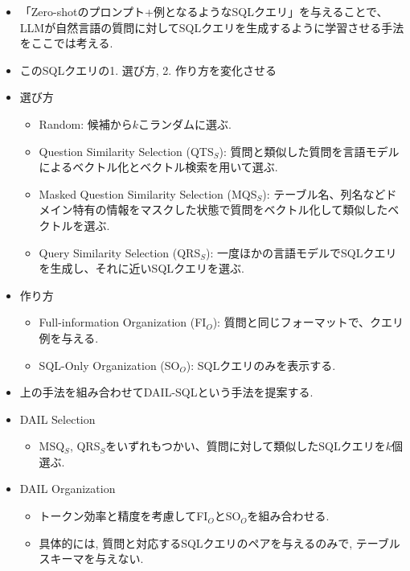 \documentclass[dvipdfmx,uplatex]{jsarticle}
\theoremstyle{remark}
\newenvironment{method}[1]{
    \begin{tcolorbox}[
        colframe=green!50!black,
        colback=green!50!black!10!white,
        colbacktitle=green!50!black!40!white,
        coltitle=black,
        fonttitle=\bfseries,
        title={#1}
    ]
}{
    \end{tcolorbox}
}
\begin{document}
\begin{method}{In-Context Learning}
\begin{itemize}
    \item 「Zero-shotのプロンプト+例となるようなSQLクエリ」を与えることで、LLMが自然言語の質問に対してSQLクエリを生成するように学習させる手法をここでは考える.
    \item このSQLクエリの1. 選び方, 2. 作り方を変化させる
    \item 選び方
    \begin{itemize}
        \item Random: 候補から$k$こランダムに選ぶ.
        \item Question Similarity Selection (QTS${}_S$): 質問と類似した質問を言語モデルによるベクトル化とベクトル検索を用いて選ぶ.
        \item Masked Question Similarity Selection (MQS${}_S$): テーブル名、列名などドメイン特有の情報をマスクした状態で質問をベクトル化して類似したベクトルを選ぶ.
        \item Query Similarity Selection (QRS${}_S$): 一度ほかの言語モデルでSQLクエリを生成し、それに近いSQLクエリを選ぶ.
    \end{itemize}
    \item 作り方
    \begin{itemize}
        \item Full-information Organization (FI${}_O$): 質問と同じフォーマットで、クエリ例を与える.
        \item SQL-Only Organization (SO${}_O$): SQLクエリのみを表示する.
    \end{itemize}
    \item 上の手法を組み合わせてDAIL-SQLという手法を提案する.
    \item DAIL Selection 
    \begin{itemize}
        \item MSQ${}_S$, QRS${}_S$をいずれもつかい、質問に対して類似したSQLクエリを$k$個選ぶ.
    \end{itemize}
    \item DAIL Organization
    \begin{itemize}
        \item トークン効率と精度を考慮してFI${}_O$とSO${}_O$を組み合わせる.
        \item 具体的には, 質問と対応するSQLクエリのペアを与えるのみで, テーブルスキーマを与えない.
    \end{itemize}
\end{itemize}
\end{method}
\end{document}
